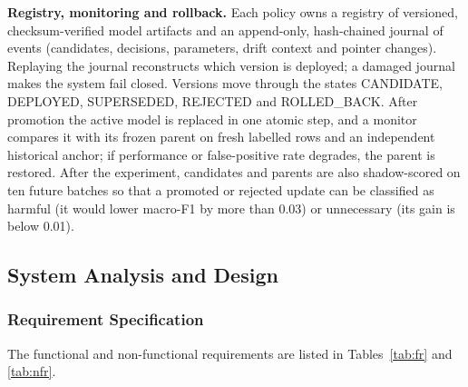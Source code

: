 \documentclass{article}
\begin{document}
\textbf{Registry, monitoring and rollback.} Each policy owns a registry of versioned, checksum-verified model artifacts and an append-only, hash-chained journal of events (candidates, decisions, parameters, drift context and pointer changes). Replaying the journal reconstructs which version is deployed; a damaged journal makes the system fail closed. Versions move through the states CANDIDATE, DEPLOYED, SUPERSEDED, REJECTED and ROLLED\_BACK. After promotion the active model is replaced in one atomic step, and a monitor compares it with its frozen parent on fresh labelled rows and an independent historical anchor; if performance or false-positive rate degrades, the parent is restored. After the experiment, candidates and parents are also shadow-scored on ten future batches so that a promoted or rejected update can be classified as harmful (it would lower macro-F1 by more than 0.03) or unnecessary (its gain is below 0.01).

	\subsection{System Analysis and Design}

	\subsubsection{Requirement Specification}

The functional and non-functional requirements are listed in Tables~\ref{tab:fr} and \ref{tab:nfr}.
\end{document}

